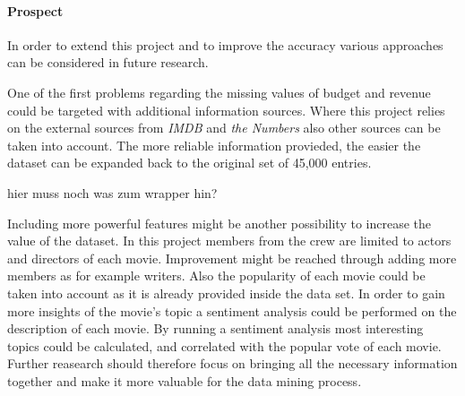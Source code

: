 \paragraph{Prospect}
In order to extend this project and to improve the accuracy various approaches can be considered in future research. 

One of the first problems regarding the missing values of budget and revenue could be targeted with additional information sources. Where this project relies on the external sources from \textit{IMDB } and \textit{the Numbers} also other sources can be taken into account. The more reliable information provieded, the easier the dataset can be expanded back to the original set of 45,000 entries.

\huge hier muss noch was zum wrapper hin?


\normalsize Including  more powerful features might be another possibility to increase the value of the dataset. In this project members from the crew are limited to actors and directors of each movie. Improvement might be reached through adding more members as for example writers. Also the popularity of each movie could be taken into account as it is already provided inside the data set. 
In order to gain more insights of the movie's topic a sentiment analysis could be performed on the description of each movie. By running a sentiment analysis most interesting topics could be calculated, and correlated with the popular vote of each movie. Further reasearch should therefore focus on bringing all the necessary information together and make it more valuable for the data mining process.

%
